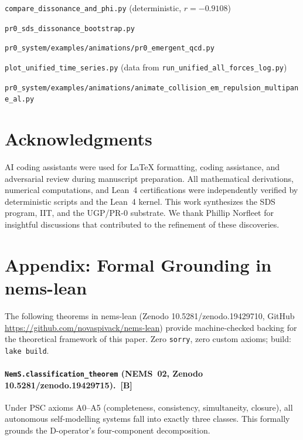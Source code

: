 \documentclass[12pt]{article}
\newcommand{\CatB}{\textbf{B}}
\begin{document}
\begin{description}[leftmargin=1.2em,itemsep=0.1em,style=nextline]
\item[D--$\Phi$ correlation] \texttt{compare\_dis\-son\-ance\_and\_phi.py} (deterministic, $r=-0.9108$)
\item[Bootstrap] \texttt{pr0\_sds\_dis\-son\-ance\_boot\-strap.py}
\item[Strong field] \texttt{pr0\_system/examples/animations/pr0\_emergent\_qcd.py}
\item[Figure~\ref{fig:timeseries}] \texttt{plot\_unified\_time\_series.py} (data from \texttt{run\_unified\_all\_forces\_log.py})
\item[EM repulsion animation] \texttt{pr0\_system/examples/animations/animate\_collision\_em\_repulsion\_multipane\_al.py}
\end{description}

\section*{Acknowledgments}

AI coding assistants were used for LaTeX formatting, coding assistance, and adversarial review during manuscript preparation. All mathematical derivations, numerical computations, and Lean~4 certifications were independently verified by deterministic scripts and the Lean~4 kernel.
This work synthesizes the SDS program, IIT, and the UGP/PR-0 substrate. We thank Phillip Norfleet for insightful discussions that contributed to the refinement of these discoveries.

\section*{Appendix: Formal Grounding in nems-lean}
\label{app:lean}

The following theorems in nems-lean (Zenodo 10.5281/\allowbreak zenodo.19429710,
GitHub \url{https://github.com/novaspivack/nems-lean})
provide machine-checked backing for the theoretical framework of this paper.
Zero \texttt{sorry}, zero custom axioms; build: \texttt{lake build}.

\paragraph{\texttt{NemS.classification\_theorem} (NEMS~02,
Zenodo 10.5281/\allowbreak zenodo.19429715).~[$\CatB$]}
Under PSC axioms A0--A5 (completeness, consistency, simultaneity, closure),
all autonomous self-modelling systems fall into exactly three classes.
This formally grounds the D-operator's four-component decomposition.
\end{document}
